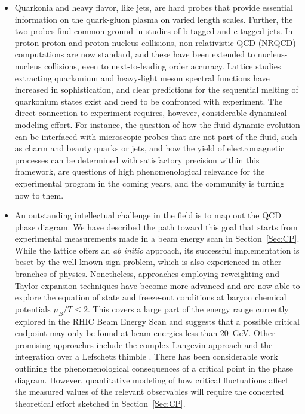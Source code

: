 \begin{itemize}
\item
Quarkonia and heavy flavor, like jets, are hard probes that provide essential information on the quark-gluon plasma on varied length scales. Further, the two probes find common ground in studies of b-tagged and c-tagged jets. In proton-proton and proton-nucleus collisions, non-relativistic-QCD (NRQCD) computations are now standard, and these have been extended to nucleus-nucleus collisions, even to next-to-leading order accuracy. Lattice studies extracting quarkonium and heavy-light meson spectral functions have increased in sophistication, and clear predictions for the sequential melting of quarkonium states exist and need to be confronted with experiment. The direct connection to experiment requires, however, considerable dynamical modeling effort. 
For instance, the question of how the fluid dynamic evolution can be
interfaced with microscopic probes that are not part of the fluid, such as charm and beauty quarks or jets, and
how the yield of electromagnetic processes can be determined with satisfactory precision within this framework, 
are questions of high phenomenological relevance for the experimental program in the coming years, and
the community is turning now to them. 

\item
An outstanding intellectual challenge in the field is to map out the QCD phase diagram. 
We have described the path toward this goal that starts from experimental measurements made
in a beam energy scan in Section~\ref{Sec:CP}.
While the lattice offers an {\it ab initio} approach, its successful implementation is beset by the well known sign problem, which is also experienced in other branches of physics. Nonetheless, approaches employing reweighting and Taylor expansion techniques have become more advanced and are now able to explore the equation of state and freeze-out 
conditions at baryon chemical potentials $\mu_B/T\le 2$. This covers a large part of the energy range currently explored in the 
RHIC Beam Energy Scan and suggests that a possible critical endpoint may only be found at beam energies less than 20~GeV. 
Other promising approaches include the complex Langevin approach \cite{Aarts:2009uq,Aarts:2014kja} and the integration over a Lefschetz thimble \cite{Cristoforetti:2012su,Aarts:2014nxa}. There has been considerable work outlining the phenomenological consequences of a critical point in the phase diagram. However, quantitative modeling of how critical fluctuations affect the measured values of the relevant observables will require the concerted theoretical effort sketched in Section~\ref{Sec:CP}.

\end{itemize}
 

